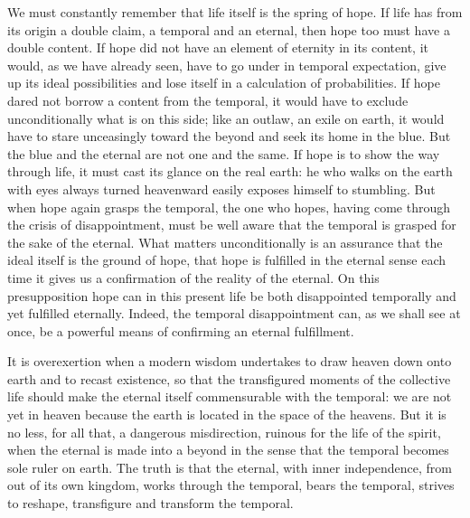 \documentclass[12pt,a4paper,openany]{book}
\newcommand{\opage}[1]{\marginnote{\footnotesize\textit{[#1]}}}
\begin{document}
We must constantly remember that life itself is the spring
of hope. If life has from its origin a double claim, a
temporal and an eternal, then hope too must have a
double content. If hope did not have an element of eternity
in its content, it would, as we have already
seen, have to go under in temporal expectation, give up its
ideal possibilities and lose itself in a calculation of probabilities.
If hope dared not borrow a content from the
temporal, it would have to exclude unconditionally what is on this side;
like an outlaw, an exile on earth, it would have to
stare unceasingly toward the beyond and seek its home
in the blue. But the blue and the eternal are not one
and the same. If hope is to show the way through life,
it must cast its glance on the real earth: he who
walks on the earth with eyes always turned heavenward easily exposes
himself to stumbling. But when hope again
grasps the temporal, the one who hopes, having come through
the crisis of disappointment, must be well aware that the
temporal is grasped for the sake of the eternal. What matters
unconditionally is an assurance that the
ideal itself is the ground of hope, that hope is fulfilled in
the eternal sense each time it gives us a confirmation
of the reality of the eternal. On this presupposition
hope can in this present life be both disappointed temporally
and yet fulfilled eternally. Indeed, the temporal disappointment
can, as we shall see at once, be a powerful means
of confirming an eternal fulfillment.

\setcounter{footnote}{0}%
\opage{31}It is overexertion when a modern wisdom
undertakes to draw heaven down onto earth and to recast
existence, so that the transfigured moments of the collective life
should make the eternal itself commensurable
with the temporal: we are not yet in heaven because
the earth is located in the space of the heavens. But it is
no less, for all that, a dangerous misdirection, ruinous for the life of the spirit,
when the eternal is made into a beyond in the sense
that the temporal becomes sole ruler on
earth. The truth is that the eternal, with inner independence,
from out of its own kingdom, works through the
temporal, bears the temporal, strives to reshape,
transfigure and transform the temporal.
\end{document}
